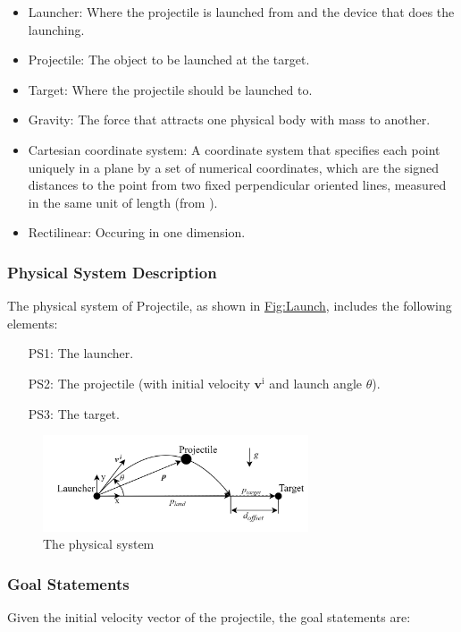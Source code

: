 \documentclass[12pt]{article}
\begin{document}
\begin{itemize}
\item{Launcher: Where the projectile is launched from and the device that does the launching.}
\item{Projectile: The object to be launched at the target.}
\item{Target: Where the projectile should be launched to.}
\item{Gravity: The force that attracts one physical body with mass to another.}
\item{Cartesian coordinate system: A coordinate system that specifies each point uniquely in a plane by a set of numerical coordinates, which are the signed distances to the point from two fixed perpendicular oriented lines, measured in the same unit of length (from \cite{cartesianWiki}).}
\item{Rectilinear: Occuring in one dimension.}
\end{itemize}
\subsubsection{Physical System Description}
\label{Sec:PhysSyst}
The physical system of Projectile, as shown in \hyperref[Figure:Launch]{Fig:Launch}, includes the following elements:

\begin{itemize}
\item[PS1:]{The launcher.}
\item[PS2:]{The projectile (with initial velocity ${\mathbf{v}^{\text{i}}}$ and launch angle $θ$).}
\item[PS3:]{The target.}
\end{itemize}
\begin{figure}
\begin{center}
\includegraphics[width=0.7\textwidth]{../../../datafiles/Projectile/Launch.jpg}
\caption{The physical system}
\label{Figure:Launch}
\end{center}
\end{figure}
\subsubsection{Goal Statements}
\label{Sec:GoalStmt}
Given the initial velocity vector of the projectile, the goal statements are:
\end{document}
